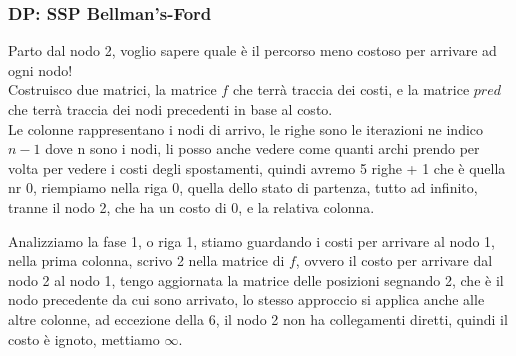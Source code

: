\documentclass{article}
\begin{document}
\subsubsection{DP: SSP Bellman's-Ford}
\begin{center}
\end{center}
Parto dal nodo 2, voglio sapere quale è il percorso meno costoso per arrivare ad ogni nodo!\\
Costruisco due matrici, la matrice $f$ che terrà traccia dei costi, e la matrice $pred$ che terrà traccia dei nodi precedenti in base al costo.\\
Le colonne rappresentano i nodi di arrivo, le righe sono le iterazioni ne indico $n-1$ dove n sono i nodi, li posso anche vedere come quanti archi prendo per volta per vedere i costi degli spostamenti, quindi avremo 5 righe + 1 che è quella nr 0, riempiamo nella riga 0, quella dello stato di partenza, tutto ad infinito, tranne il nodo 2, che ha un costo di 0, e la relativa colonna.
\begin{center}
\end{center}

Analizziamo la fase 1, o riga 1, stiamo guardando i costi per arrivare al nodo 1, nella prima colonna, scrivo 2 nella matrice di $f$, ovvero il costo per arrivare dal nodo 2 al nodo 1, tengo aggiornata la matrice delle posizioni segnando 2, che è il nodo precedente da cui sono arrivato, lo stesso approccio si applica anche alle altre colonne, ad eccezione della 6, il nodo 2 non ha collegamenti diretti, quindi il costo è ignoto, mettiamo $\infty$.
\end{document}
